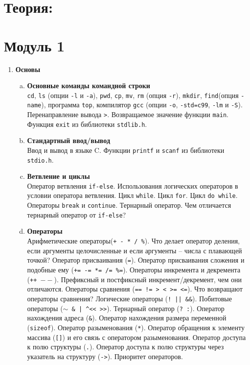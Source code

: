 \documentclass{article}
\begin{document}

\section*{Теория:}

\section*{Модуль 1}
\begin{enumerate}
\item \textbf{Основы}\\

\begin{enumerate}[a.]
\item \textbf{Основные команды командной строки}\\
\texttt{cd}, \texttt{ls} (опции \texttt{-l} и \texttt{-a}), \texttt{pwd}, \texttt{cp}, \texttt{mv}, \texttt{rm} (опция \texttt{-r}), \texttt{mkdir}, \texttt{find}(опция \texttt{-name}), программа \texttt{top}, компилятор \texttt{gcc} (опции \texttt{-o}, \texttt{-std=c99}, \texttt{-lm} и \texttt{-S}). Перенаправление вывода \texttt{>}. Возвращаемое значение функции \texttt{main}. Функция \texttt{exit} из библиотеки \texttt{stdlib.h}.

\item \textbf{Стандартный ввод/вывод}\\
Ввод и вывод в языке C. Функции \texttt{printf} и \texttt{scanf} из библиотеки \texttt{stdio.h}.


\item \textbf{Ветвление и циклы}\\
Оператор ветвления \texttt{if-else}. Использования логических операторов в условии оператора ветвления.  Цикл \texttt{while}. Цикл \texttt{for}. Цикл \texttt{do while}. Операторы \texttt{break} и \texttt{continue}. Тернарный оператор. Чем отличается тернарный оператор от \texttt{if-else}?


\item \textbf{Операторы}\\
Арифметические операторы(\texttt{+ - * / \%}). Что делает оператор деления, если аргументы целочисленные и если аргументы -- числа с плавающей точкой? Оператор присваивания (\texttt{=}). Оператор присваивания сложения и подобные ему (\texttt{+= -= *= /= \%=}). Операторы инкремента и декремента (\texttt{++  $--$}). Префиксный  и постфиксный инкремент/декремент, чем они отличаются. Операторы сравнения (\texttt{== != > < >= <=}). Что возвращают операторы сравнения? Логические операторы (\texttt{!  ||  \&\&}). Побитовые операторы (\texttt{$\sim$  \&  |  \textasciicircum \quad <{}<  >{}>}). Тернарный оператор (\texttt{? :}). Оператор нахождения адреса (\texttt{\&}). Оператор нахождения размера переменной (\texttt{sizeof}). Оператор разыменования (\texttt{*}). Оператор обращения к элементу массива (\texttt{[]}) и его связь с оператором разыменования. Оператор доступа к полю структуры (\texttt{.}). Оператор доступа к полю структуры через указатель на структуру (\texttt{->}). Приоритет операторов. 
\end{enumerate}





\end{enumerate}
\end{document}
